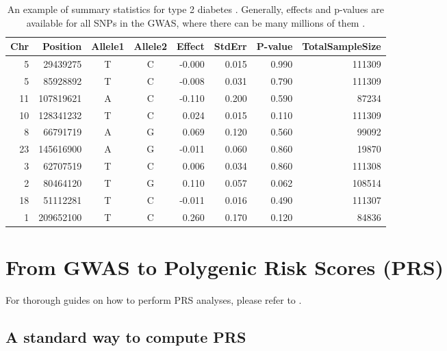 \begin{table}[ht]
\caption{An example of summary statistics for type 2 diabetes \cite[]{scott2017expanded}. Generally, effects and p-values are available for all SNPs in the GWAS, where there can be many millions of them \cite[]{asking4more}.}\label{tab:sumstats}
\vspace{0.5em}
\centering
\begin{tabular}{rrccrrrr}
  \hline
Chr & Position & Allele1 & Allele2 & Effect & StdErr & P-value & TotalSampleSize \\ 
  \hline
   5 & 29439275 & T & C & -0.000 & 0.015 & 0.990 & 111309 \\ 
     5 & 85928892 & T & C & -0.008 & 0.031 & 0.790 & 111309 \\ 
    11 & 107819621 & A & C & -0.110 & 0.200 & 0.590 & 87234 \\ 
    10 & 128341232 & T & C & 0.024 & 0.015 & 0.110 & 111309 \\ 
     8 & 66791719 & A & G & 0.069 & 0.120 & 0.560 & 99092 \\ 
    23 & 145616900 & A & G & -0.011 & 0.060 & 0.860 & 19870 \\ 
     3 & 62707519 & T & C & 0.006 & 0.034 & 0.860 & 111308 \\ 
     2 & 80464120 & T & G & 0.110 & 0.057 & 0.062 & 108514 \\ 
    18 & 51112281 & T & C & -0.011 & 0.016 & 0.490 & 111307 \\ 
     1 & 209652100 & T & C & 0.260 & 0.170 & 0.120 & 84836 \\ 
   \hline
\end{tabular}
\end{table}




\section{From GWAS to Polygenic Risk Scores (PRS)}

For thorough guides on how to perform PRS analyses, please refer to \cite{wray2014research,chasioti2019progress,choi2018guide}.

\subsection{A standard way to compute PRS}\label{sec:C+T}

